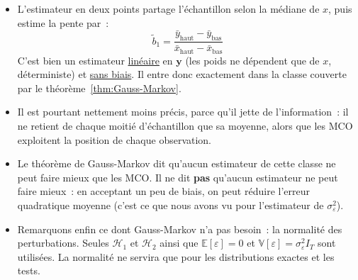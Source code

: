 \documentclass[10pt,a4paper]{article}
\theoremstyle{definition}
\renewcommand{\newline}{\unskip\par\vspace{1.5pt}}
\begin{document}
\begin{notes}

  \begin{itemize}

  \item L'estimateur \guillemotleft en deux points \guillemotright{} partage
    l'échantillon selon la médiane de $x$, puis estime la pente par~:
    \[
      \tilde b_1 = \frac{\bar y_{\text{haut}} - \bar y_{\text{bas}}}
                        {\bar x_{\text{haut}} - \bar x_{\text{bas}}}
    \]
    C'est bien un estimateur \underline{linéaire} en $\mathbf y$ (les poids ne dépendent
    que de $x$, déterministe) et \underline{sans biais}. Il entre donc exactement dans
    la classe couverte par le théorème~\ref{thm:Gauss-Markov}.\newline

  \item Il est pourtant nettement moins précis, parce qu'il jette de l'information~:
    il ne retient de chaque moitié d'échantillon que sa moyenne, alors que les MCO
    exploitent la position de chaque observation.\newline

  \item Le théorème de Gauss-Markov dit qu'aucun estimateur de cette classe ne peut
    faire mieux que les MCO. Il ne dit \textbf{pas} qu'aucun estimateur ne peut faire
    mieux~: en acceptant un peu de biais, on peut réduire l'erreur quadratique moyenne
    (c'est ce que nous avons vu pour l'estimateur de $\sigma_{\varepsilon}^2$).\newline

  \item Remarquons enfin ce dont Gauss-Markov n'a pas besoin~: la normalité des
    perturbations. Seules $\mathcal H_1$ et $\mathcal H_2$ ainsi que
    $\mathbb E[\varepsilon]=0$ et $\mathbb V[\varepsilon]=\sigma_{\varepsilon}^2 I_T$
    sont utilisées. La normalité ne servira que pour les distributions exactes et les
    tests.

  \end{itemize}

\end{notes}
\end{document}

